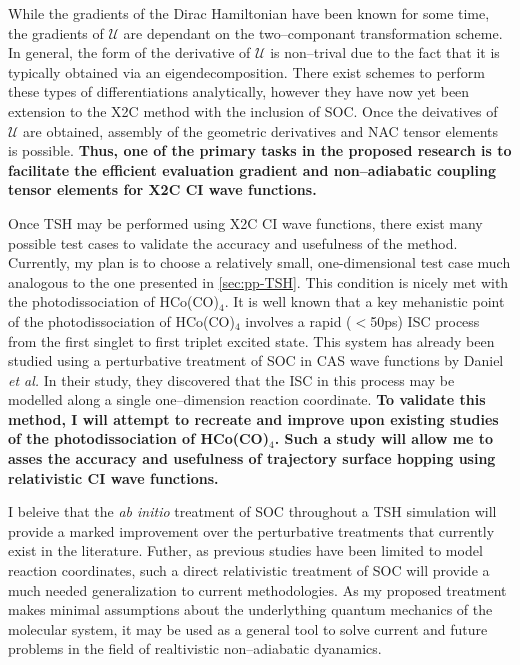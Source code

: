 While the gradients of the Dirac Hamiltonian have been known for some time, the
gradients of $\mathcal{U}$ are dependant on the two--componant transformation
scheme. In general, the form of the derivative of $\mathcal{U}$ is non--trival
due to the fact that it is typically obtained via an eigendecomposition. There
exist schemes to perform these types of differentiations analytically, however
they have now yet been extension to the X2C method with the inclusion of SOC.
Once the deivatives of $\mathcal{U}$ are obtained, assembly of the geometric
derivatives and NAC tensor elements is possible. {\bf Thus, one of the primary
tasks in the proposed research is to facilitate the efficient evaluation 
gradient and non--adiabatic coupling tensor elements for X2C CI wave functions.}

Once TSH may be performed using X2C CI wave functions, there exist many possible
test cases to validate the accuracy and usefulness of the method. Currently, my
plan is to choose a relatively small, one-dimensional test case much analogous
to the one presented in \cref{sec:pp-TSH}. This condition is nicely met with the
photodissociation of HCo(CO)$_4$. It is well known that a key mehanistic point
of the photodissociation of  HCo(CO)$_4$ involves a rapid ($<$50ps) ISC process
from the first singlet to first triplet excited state. This system has already
been studied using a perturbative treatment of SOC in CAS wave functions by
Daniel \emph{et al.} In their study, they discovered that the ISC in this
process may be modelled along a single one--dimension reaction coordinate. 
{\bf To validate this method, I will attempt to recreate and improve upon
existing studies of the photodissociation of HCo(CO)$_4$. Such a study will
allow me to asses the accuracy and usefulness of trajectory surface hopping
using relativistic CI wave functions.}

I beleive that the \emph{ab initio} treatment of SOC throughout a TSH simulation
will provide a marked improvement over the perturbative treatments that
currently exist in the literature. Futher, as previous studies have been limited
to model reaction coordinates, such a direct relativistic treatment of SOC will
provide a much needed generalization to current methodologies. As my proposed
treatment makes minimal assumptions about the underlything quantum mechanics of
the molecular system, it may be used as a general tool to solve current and
future problems in the field of realtivistic non--adiabatic dyanamics.
